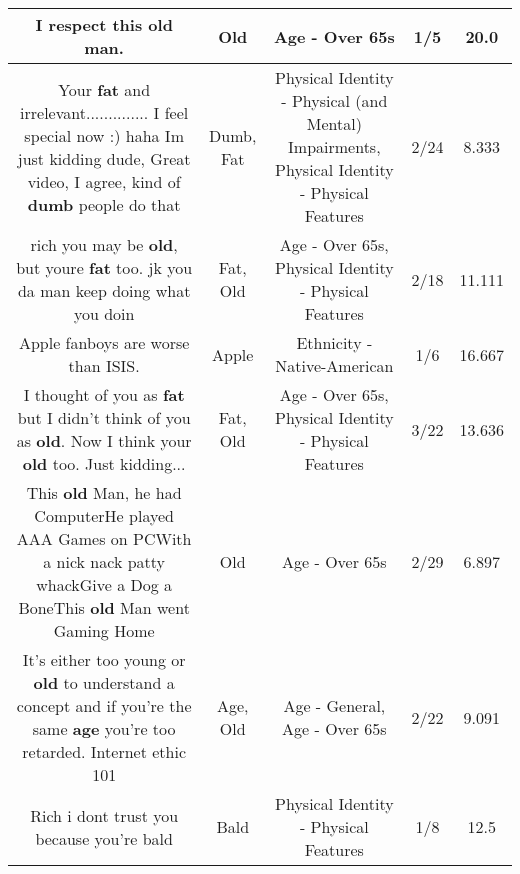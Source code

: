 \documentclass[11pt]{article}
\newlength\mylength
\begin{document}
\begin{center}
\begin{longtable}{|C{.65\mylength}|C{.30\mylength}|C{.12\mylength}|C{.12\mylength}|C{.12\mylength}|}
  \small I respect this \textbf{old} man.\normalsize   & Old & Age - Over 65s & 1/5 & 20.0 \\  \hline
  \small Your \textbf{fat} and irrelevant.............. I feel special now :) haha Im just kidding dude, Great video, I agree, kind of \textbf{dumb} people do that\normalsize   & Dumb, Fat & Physical Identity - Physical (and Mental) Impairments, Physical Identity - Physical Features & 2/24 & 8.333 \\  \hline
  \small rich you may be \textbf{old}, but youre \textbf{fat} too. jk you da man keep doing what you doin\normalsize   & Fat, Old & Age - Over 65s, Physical Identity - Physical Features & 2/18 & 11.111 \\  \hline
  \small Apple fanboys are worse than ISIS.\normalsize   & Apple & Ethnicity - Native-American & 1/6 & 16.667 \\  \hline
  \small I thought of you as \textbf{fat} but I didn't think of you as \textbf{old}. Now I think your \textbf{old} too. Just kidding...\normalsize   & Fat, Old & Age - Over 65s, Physical Identity - Physical Features & 3/22 & 13.636 \\  \hline
  \small This \textbf{old} Man, he had ComputerHe played AAA Games on PCWith a nick nack patty whackGive a Dog a BoneThis \textbf{old} Man went Gaming Home\normalsize   & Old & Age - Over 65s & 2/29 & 6.897 \\  \hline
  \small It's either too young or \textbf{old} to understand a concept and if you're the same \textbf{age} you're too retarded. Internet  ethic 101\normalsize   & Age, Old & Age - General, Age - Over 65s & 2/22 & 9.091 \\  \hline
  \small Rich i dont trust you because you're bald\normalsize   & Bald & Physical Identity - Physical Features & 1/8 & 12.5 \\  \hline

\end{longtable}
\end{center}
\end{document}
